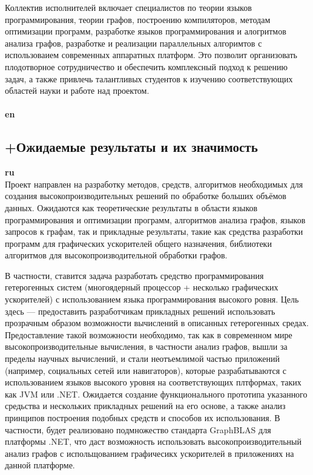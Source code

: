 \documentclass[12pt]{article}  %
\theoremstyle{remark}
\begin{document}
Коллектив исполнителей включает специалистов по теории языков программирования, теории графов, построению компиляторов, методам оптимизации программ,  разработке языков программирования и алогритмов анализа графов, разработке и реализации параллельных алгоримтов с использоваием современных аппаратных платформ. Это позволит организовать плодотворное сотрудничество и обеспечить комплексный подход к решению задач, а также привлечь талантливых студентов к изучению соответствующих областей науки и работе над проектом.
\\
\\
\textbf{en}\\

\subsection{+Ожидаемые результаты и их значимость}

\textbf{ru}\\

Проект направлен на разработку методов, средств, алгоритмов необходимых для создания высокопроизводительных решений по обработке больших объёмов данных. Ожидаются как теоретические результаты в области языков программирования и оптимизации программ, алгоритмов анализа графов, языков запросов к графам, так и прикладные результаты, такие как средства разработки программ для графических ускорителей общего назначения, библиотеки алгоритмов для высокопроизводительной обработки графов.

В частности, ставится задача разработать средство программирования гетерогенных систем (многоядерный процессор + несколько графических ускорителей) с использованием языка программирования высокого ровня. Цель здесь --- предоставить разработчикам прикладных решений использовать прозрачным образом возможности вычислений в описанных гетерогенных средах. Предоставление такой возможности необходимо, так как в современном мире высокопроизводительные вычисления, в частности анализ графов, вышли за пределы научных вычислений, и стали неотъемлимой частью приложений (например, социальных сетей или навигаторов), которые разрабатываются с использованием языков высокого уровня на соответствующих плтформах, таких как JVM или .NET. Ожидается создание функционального прототипа указанного средьства и нескольких прикладных решений на его основе, а также анализ принципов построения подобных средств и способов их использования. В частности, будет реализовано подмножество стандарта GraphBLAS для платформы .NET, что даст возможность использовать высокопроизводительный анализ графов с испольщованием графичесикх ускорителей в приложениях на данной платформе.
\end{document}
